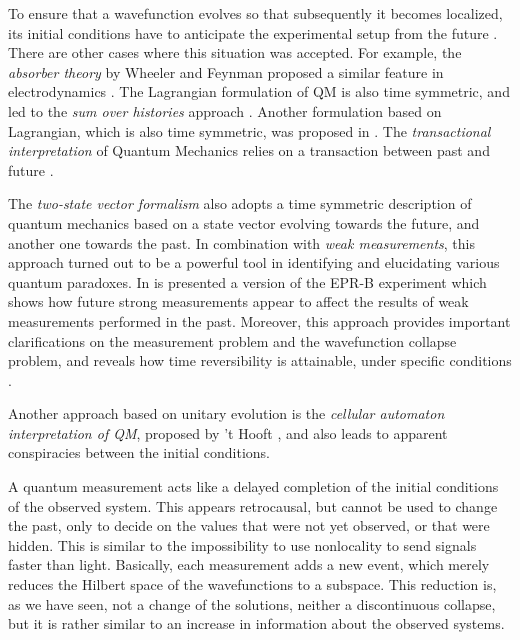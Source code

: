 \documentclass[12pt]{amsart}
\theoremstyle{definition}
\theoremstyle{plain}
\begin{document}
To ensure that a wavefunction evolves so that subsequently it becomes localized, its initial conditions have to anticipate the experimental setup from the future \cite{Sto12QMb}. There are other cases where this situation was accepted. For example, the \emph{absorber theory} by Wheeler and Feynman proposed a similar feature in electrodynamics \cite{WheelerFeynman1945AbsorberTheory,WheelerFeynman1949ClassicalElectrodynamicsAbsorber}.
The Lagrangian formulation of QM is also time symmetric, and led to the \emph{sum over histories} approach \cite{Feynman1948SpaceTimeApproachToQM,FeynmanHibbs1965QMAndPathIntegrals}. Another formulation based on Lagrangian, which is also time symmetric, was proposed in \cite{Wharton2007TimeSymmetricQM}.
The \emph{transactional interpretation} of Quantum Mechanics relies on a transaction between past and future \cite{cramer1986transactional,cramer1988overview}.

The \textit{two-state vector formalism} \cite{aharonov1964time,aharonov1988result,aharonov1991complete,aharonov2007newinsights,aharonov2007TSV} also adopts a time symmetric description of quantum mechanics based on a state vector evolving towards the future, and another one towards the past.
In combination with \emph{weak measurements}, this approach turned out to be a powerful tool in identifying and elucidating various quantum paradoxes. In \cite{aharonov2012future-past} is presented a version of the EPR-B experiment which shows how future strong measurements appear to affect the results of weak measurements performed in the past. Moreover, this approach provides important clarifications on the measurement problem and the wavefunction collapse problem, and reveals how time reversibility is attainable, under specific conditions \cite{AharonovCohen2014MeasurementCollapse}.

Another approach based on unitary evolution is the \emph{cellular automaton interpretation of QM}, proposed by 't Hooft \cite{tH07,tHooft2014CellularAutomatonInterpretationQM,Elze2014Action4CellularAutomata}, and also leads to apparent conspiracies between the initial conditions.

A quantum measurement acts like a delayed completion of the initial conditions of the observed system. This appears retrocausal, but cannot be used to change the past, only to decide on the values that were not yet observed, or that were hidden. This is similar to the impossibility to use nonlocality to send signals faster than light.
Basically, each measurement adds a new event, which merely reduces the Hilbert space of the wavefunctions to a subspace. This reduction is, as we have seen, not a change of the solutions, neither a discontinuous collapse, but it is rather similar to an increase in information about the observed systems.
\end{document}
